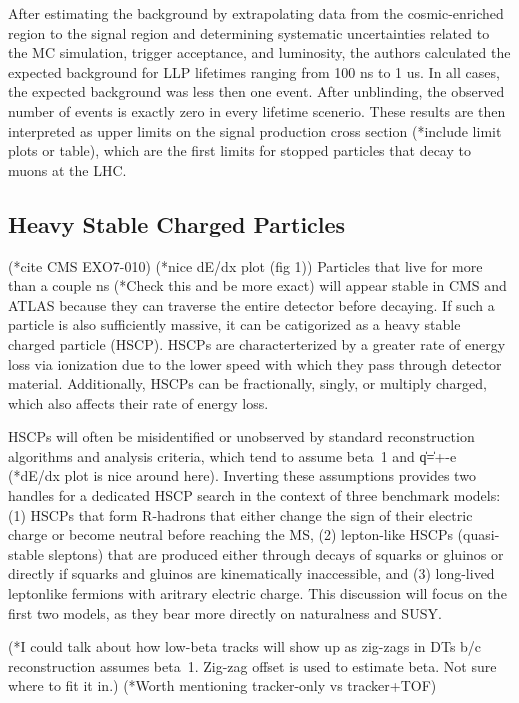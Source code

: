 \documentclass[12pt]{article}
\begin{document}
    After estimating the background by extrapolating data from the cosmic-enriched region to the signal region and determining systematic uncertainties related to the MC simulation, trigger acceptance, and luminosity, the authors calculated the expected background for LLP lifetimes ranging from 100 ns to 1 us. In all cases, the expected background was less then one event. After unblinding, the observed number of events is exactly zero in every lifetime scenerio. These results are then interpreted as upper limits on the signal production cross section (*include limit plots or table), which are the first limits for stopped particles that decay to muons at the LHC.

\subsection{Heavy Stable Charged Particles}
    (*cite CMS EXO7-010)
    (*nice dE/dx plot (fig 1))
    Particles that live for more than a couple ns (*Check this and be more exact) will appear stable in CMS and ATLAS because they can traverse the entire detector before decaying. If such a particle is also sufficiently massive, it can be catigorized as a heavy stable charged particle (HSCP). HSCPs are characterterized by a greater rate of energy loss via ionization due to the lower speed with which they pass through detector material. Additionally, HSCPs can be fractionally, singly, or multiply charged, which also affects their rate of energy loss. 

    HSCPs will often be misidentified or unobserved by standard reconstruction algorithms and analysis criteria, which tend to assume beta~1 and \|q\|=+-e (*dE/dx plot is nice around here). Inverting these assumptions provides two handles for a dedicated HSCP search in the context of three benchmark models: (1) HSCPs that form R-hadrons that either change the sign of their electric charge or become neutral before reaching the MS, (2) lepton-like HSCPs (quasi-stable sleptons) that are produced either through decays of squarks or gluinos or directly if squarks and gluinos are kinematically inaccessible, and (3) long-lived leptonlike fermions with aritrary electric charge. This discussion will focus on the first two models, as they bear more directly on naturalness and SUSY.

    (*I could talk about how low-beta tracks will show up as zig-zags in DTs b/c reconstruction assumes beta~1. Zig-zag offset is used to estimate beta. Not sure where to fit it in.) (*Worth mentioning tracker-only vs tracker+TOF)
\end{document}
